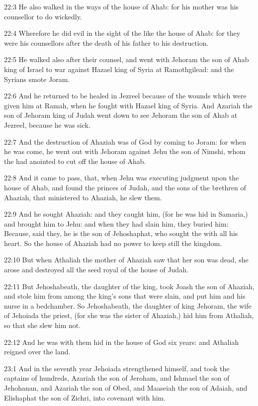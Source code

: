 22:3 He also walked in the ways of the house of Ahab: for his mother was his counsellor to do wickedly.

22:4 Wherefore he did evil in the sight of the \LORD like the house of Ahab: for they were his counsellors after the death of his father to his destruction.

22:5 He walked also after their counsel, and went with Jehoram the son of Ahab king of Israel to war against Hazael king of Syria at Ramothgilead: and the Syrians smote Joram.

22:6 And he returned to be healed in Jezreel because of the wounds which were given him at Ramah, when he fought with Hazael king of Syria. And Azariah the son of Jehoram king of Judah went down to see Jehoram the son of Ahab at Jezreel, because he was sick.

22:7 And the destruction of Ahaziah was of God by coming to Joram: for when he was come, he went out with Jehoram against Jehu the son of Nimshi, whom the \LORD had anointed to cut off the house of Ahab.

22:8 And it came to pass, that, when Jehu was executing judgment upon the house of Ahab, and found the princes of Judah, and the sons of the brethren of Ahaziah, that ministered to Ahaziah, he slew them.

22:9 And he sought Ahaziah: and they caught him, (for he was hid in Samaria,) and brought him to Jehu: and when they had slain him, they buried him: Because, said they, he is the son of Jehoshaphat, who sought the \LORD with all his heart. So the house of Ahaziah had no power to keep still the kingdom.

22:10 But when Athaliah the mother of Ahaziah saw that her son was dead, she arose and destroyed all the seed royal of the house of Judah.

22:11 But Jehoshabeath, the daughter of the king, took Joash the son of Ahaziah, and stole him from among the king's sons that were slain, and put him and his nurse in a bedchamber. So Jehoshabeath, the daughter of king Jehoram, the wife of Jehoiada the priest, (for she was the sister of Ahaziah,) hid him from Athaliah, so that she slew him not.

22:12 And he was with them hid in the house of God six years: and Athaliah reigned over the land.

23:1 And in the seventh year Jehoiada strengthened himself, and took the captains of hundreds, Azariah the son of Jeroham, and Ishmael the son of Jehohanan, and Azariah the son of Obed, and Maaseiah the son of Adaiah, and Elishaphat the son of Zichri, into covenant with him.

